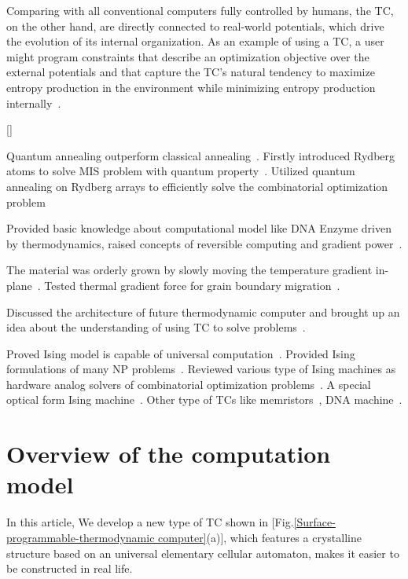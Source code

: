 \documentclass[twocolumn,superscriptaddress,english,showpacs,longbibliography]{revtex4-2}
\newcommand{\ym}[1]{[{\color{red}{YM: #1}}]}
\begin{document}
Comparing with all conventional computers fully controlled by humans, the TC, on the other hand, are directly connected to real-world potentials, which drive the
evolution of its internal organization. As an example of using a TC, a user might program
constraints that describe an optimization objective
over the external potentials and that capture the TC’s
natural tendency to maximize entropy production in the
environment while minimizing entropy production internally~\cite{conte2019thermodynamic}.

\ym{Need to add a brief summary about the state-of-the-art TCs. Following is some basic summaries of references}

Quantum annealing outperform classical annealing~\cite{boixo2013experimental, boixo2014evidence}.
Firstly introduced Rydberg atoms to solve MIS problem with quantum property~\cite{Pichler2018}. Utilized quantum annealing on Rydberg arrays to efficiently solve the combinatorial optimization problem~\cite{Nguyen2023}

Provided basic knowledge about computational model like DNA Enzyme driven by thermodynamics, raised concepts of reversible computing and gradient power~\cite{Feynman2018}.

The material was orderly grown by slowly moving the temperature gradient in-plane~\cite{Zhang2014}. Tested thermal gradient force for grain boundary migration~\cite{Bai2015}.

Discussed the architecture of future thermodynamic computer and brought up an idea about the understanding of using TC to solve problems~\cite{hylton2021vision}.


Proved Ising model is capable of universal computation~\cite{gu2012encoding}. Provided Ising formulations of many NP problems~\cite{lucas2014ising}. Reviewed various type of Ising machines as hardware analog solvers of combinatorial optimization problems~\cite{mohseni2022ising}. A special optical form Ising machine~\cite{fabre2014optical}. Other type of TCs like memristors~\cite{yang2013memristive, wang2017memristors, kumar2017chaotic,wang2018fully}, DNA machine~\cite{tanaka2005design}. 




\section{Overview of the computation model}\label{Overview-of-main-results}
In this article, We develop a new type of TC shown in [Fig.\ref{Surface-programmable-thermodynamic computer}(a)], which features a crystalline structure based on an universal elementary cellular automaton, makes it easier to be constructed in real life. 
\end{document}
